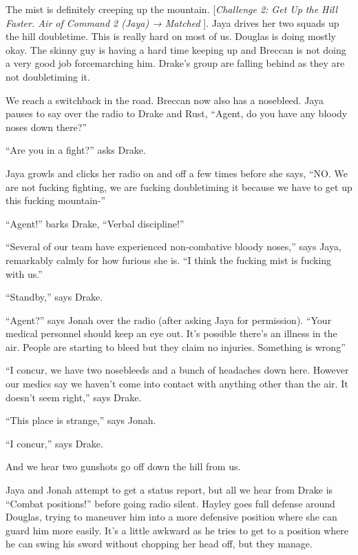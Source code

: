 The mist is definitely creeping up the mountain.  {[}\textit{Challenge 2: Get Up the Hill Faster.  Air of Command 2 (Jaya) → Matched }{]}. Jaya drives her two squads up the hill doubletime.  This is really hard on most of us.  Douglas is doing mostly okay.  The skinny guy is having a hard time keeping up and Breccan is not doing a very good job forcemarching him.  Drake's group are falling behind as they are not doubletiming it.



We reach a switchback in the road.  Breccan now also has a nosebleed.  Jaya pauses to say over the radio to Drake and Rust, ``Agent, do you have any bloody noses down there?''

``Are you in a fight?'' asks Drake.

Jaya growls and clicks her radio on and off a few times before she says, ``NO.  We are not fucking fighting, we are fucking doubletiming it because we have to get up this fucking mountain-''

``Agent!'' barks Drake, ``Verbal discipline!''

``Several of our team have experienced non-combative bloody noses,'' says Jaya, remarkably calmly for how furious she is.  ``I think the fucking mist is fucking with us.''

``Standby,'' says Drake.

``Agent?'' says Jonah over the radio (after asking Jaya for permission).  ``Your medical personnel should keep an eye out.  It's possible there's an illness in the air.  People are starting to bleed but they claim no injuries.  Something is wrong''

``I concur, we have two nosebleeds and a bunch of headaches down here.  However our medics say we haven't come into contact with anything other than the air.  It doesn't seem right,'' says Drake.

``This place is strange,'' says Jonah.

``I concur,'' says Drake. 

And we hear two gunshots go off down the hill from us.



Jaya and Jonah attempt to get a status report, but all we hear from Drake is ``Combat positions!'' before going radio silent.  Hayley goes full defense around Douglas, trying to maneuver him into a more defensive position where she can guard him more easily.  It's a little awkward as he tries to get to a position where he can swing his sword without chopping her head off, but they manage.

